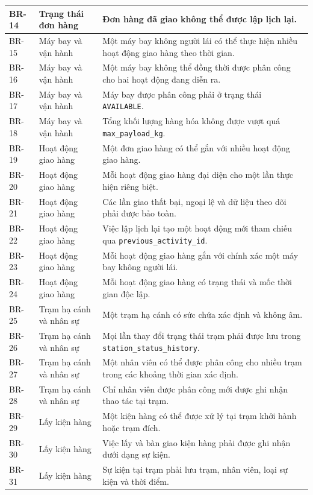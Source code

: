 \begin{longtable}{|p{1.8cm}|p{3.8cm}|p{9cm}|}
BR-14 & Trạng thái đơn hàng & Đơn hàng đã giao không thể được lập lịch lại. \\ \hline 
BR-15 & Máy bay và vận hành & Một máy bay không người lái có thể thực hiện nhiều hoạt động giao hàng theo thời gian. \\ \hline 
BR-16 & Máy bay và vận hành & Một máy bay không thể đồng thời được phân công cho hai hoạt động đang diễn ra. \\ \hline 
BR-17 & Máy bay và vận hành & Máy bay được phân công phải ở trạng thái \texttt{AVAILABLE}. \\ \hline 
BR-18 & Máy bay và vận hành & Tổng khối lượng hàng hóa không được vượt quá \texttt{max\_payload\_kg}. \\ \hline 
BR-19 & Hoạt động giao hàng & Một đơn giao hàng có thể gắn với nhiều hoạt động giao hàng. \\ \hline 
BR-20 & Hoạt động giao hàng & Mỗi hoạt động giao hàng đại diện cho một lần thực hiện riêng biệt. \\ \hline 
BR-21 & Hoạt động giao hàng & Các lần giao thất bại, ngoại lệ và dữ liệu theo dõi phải được bảo toàn. \\ \hline 
BR-22 & Hoạt động giao hàng & Việc lập lịch lại tạo một hoạt động mới tham chiếu qua \texttt{previous\_activity\_id}. \\ \hline 
BR-23 & Hoạt động giao hàng & Mỗi hoạt động giao hàng gắn với chính xác một máy bay không người lái. \\ \hline 
BR-24 & Hoạt động giao hàng & Mỗi hoạt động giao hàng có trạng thái và mốc thời gian độc lập. \\ \hline 
BR-25 & Trạm hạ cánh và nhân sự & Một trạm hạ cánh có sức chứa xác định và không âm. \\ \hline 
BR-26 & Trạm hạ cánh và nhân sự & Mọi lần thay đổi trạng thái trạm phải được lưu trong \texttt{station\_status\_history}. \\ \hline 
BR-27 & Trạm hạ cánh và nhân sự & Một nhân viên có thể được phân công cho nhiều trạm trong các khoảng thời gian xác định. \\ \hline 
BR-28 & Trạm hạ cánh và nhân sự & Chỉ nhân viên được phân công mới được ghi nhận thao tác tại trạm. \\ \hline 
BR-29 & Lấy kiện hàng & Một kiện hàng có thể được xử lý tại trạm khởi hành hoặc trạm đích. \\ \hline 
BR-30 & Lấy kiện hàng & Việc lấy và bàn giao kiện hàng phải được ghi nhận dưới dạng sự kiện. \\ \hline 
BR-31 & Lấy kiện hàng & Sự kiện tại trạm phải lưu trạm, nhân viên, loại sự kiện và thời điểm. \\ \hline 

\end{longtable}
